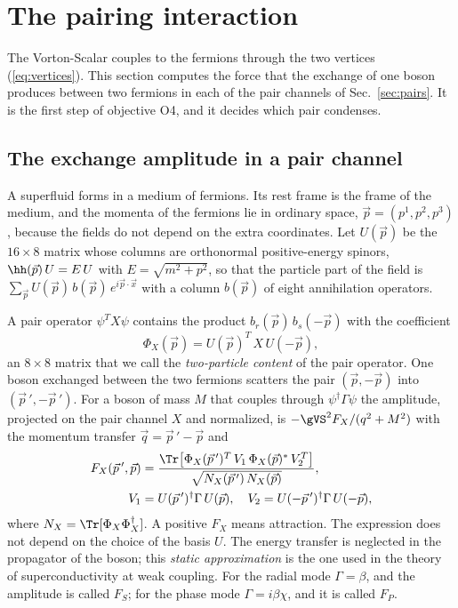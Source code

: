 
\section{The pairing interaction}
\label{sec:pairing}

The Vorton-Scalar couples to the fermions through the two vertices (\ref{eq:vertices}). This section
computes the force that the exchange of one boson produces between two fermions in each of the pair
channels of Sec.~\ref{sec:pairs}. It is the first step of objective O4, and it decides which pair
condenses.

\subsection{The exchange amplitude in a pair channel}

A superfluid forms in a medium of fermions. Its rest frame is the frame of the medium, and the momenta
of the fermions lie in ordinary space, $\vec p=(p^1,p^2,p^3)$, because the fields do not depend on the
extra coordinates. Let $U(\vec p)$ be the $16\times8$ matrix whose columns are orthonormal
positive-energy spinors, $\hh(\vec p)\,U=E\,U$ with $E=\sqrt{m^2+p^2}$, so that the particle part of the
field is $\sum_{\vec p}U(\vec p)\,b(\vec p)\,e^{i\vec p\cdot\vec x}$ with a column $b(\vec p)$ of eight
annihilation operators.

A pair operator $\psi^TX\psi$ contains the product $b_r(\vec p)\,b_s(-\vec p)$ with the coefficient
\begin{equation}
\Phi_X(\vec p)=U(\vec p)^T\,X\,U(-\vec p),
\label{eq:content}
\end{equation}
an $8\times8$ matrix that we call the \emph{two-particle content} of the pair operator. One boson
exchanged between the two fermions scatters the pair $(\vec p,-\vec p)$ into
$(\vec p\,',-\vec p\,')$. For a boson of mass $M$ that couples through $\psi^\dagger\Gamma\psi$ the
amplitude, projected on the pair channel $X$ and normalized, is $-\gVS^2F_X/(q^2+M^2)$ with the
momentum transfer $\vec q=\vec p\,'-\vec p$ and
\begin{align}
F_X(\vec p\,',\vec p)&=\frac{\Tr\big[\Phi_X(\vec p\,')^{T}\,V_1\,\Phi_X(\vec p)^{*}\,V_2^{T}\big]}{\sqrt{N_X(\vec p\,')\,N_X(\vec p)}},\nonumber\\
V_1&=U(\vec p\,')^\dagger\Gamma\,U(\vec p),\quad V_2=U(-\vec p\,')^\dagger\Gamma\,U(-\vec p),
\label{eq:FX}
\end{align}
where $N_X=\Tr[\Phi_X\Phi_X^\dagger]$. A positive $F_X$ means attraction. The expression does not
depend on the choice of the basis $U$. The energy transfer is neglected in the propagator of the
boson; this \emph{static approximation} is the one used in the theory of superconductivity at weak
coupling. For the radial mode $\Gamma=\beta$, and the amplitude is called $F_S$; for the phase mode
$\Gamma=i\beta\chi$, and it is called $F_P$.

